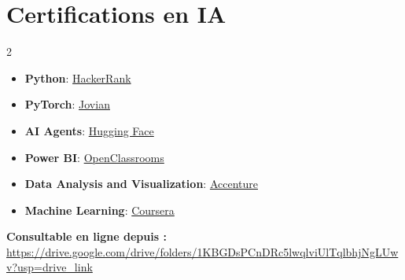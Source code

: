 \documentclass[letterpaper,10pt]{article}
\begin{document}
\section{Certifications en IA}
\begin{multicols}{2}
\begin{itemize}[leftmargin=*, noitemsep]
  \item \textbf{Python}: \href{https://www.hackerrank.com/certificates/ab53694f520a}{HackerRank}
  \item \textbf{PyTorch}: \href{https://jovian.com/certificate/MFQTQNBWGA}{Jovian}
  \item \textbf{AI Agents}: \href{https://huggingface.co/spaces/agents-course/Unit4-Final-Certificate}{Hugging Face}
  
  \columnbreak
  \item \textbf{Power BI}: \href{https://openclassrooms.com/fr/courses/7110891/certificate_}{OpenClassrooms}
  \item \textbf{Data Analysis and Visualization}: \href{https://forage-uploads-prod.s3.amazonaws.com/completion-certificates/Accenture%20North%20America/hzmoNKtzvAzXsEqx8_Accenture%20North%20America_zHgByq2kErH8rNaDD_1698163364092_completion_certificate.pdf}{Accenture}
  \item \textbf{Machine Learning}: \href{https://www.coursera.org/account/accomplishments}{Coursera}

  

\end{itemize}
\end{multicols}
\newline
\textbf{Consultable en ligne depuis : } \url{https://drive.google.com/drive/folders/1KBGDsPCnDRc5lwqlviUlTqlbhjNgLUwv?usp=drive_link}


\end{document}
